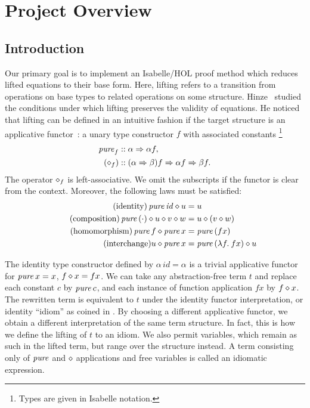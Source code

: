 \section{Project Overview}\label{sec:overview}

\subsection{Introduction}\label{subsec:introduction}

Our primary goal is to implement an Isabelle/HOL proof method which reduces
lifted equations to their base form.
Here, lifting refers to a transition from operations on base types to related
operations on some structure.
Hinze~\cite{hinze10} studied the conditions under which lifting preserves the
validity of equations.
He noticed that lifting can be defined in an intuitive fashion if the target
structure is an applicative functor~\cite{mcbride08}:
a unary type constructor $f$ with associated constants%
\footnote{Types are given in Isabelle notation.}
\begin{align*}
	\operatorname{\mathit{pure}}_f &\mathrel{::} \alpha \Rightarrow \alpha f, \\
	(\diamond_f) &\mathrel{::} (\alpha \Rightarrow \beta) f \Rightarrow \alpha f \Rightarrow \beta f.
\end{align*}
The operator $\diamond_f$ is left-associative.
We omit the subscripts if the functor is clear from the context.
Moreover, the following laws must be satisfied:
\begin{align*}
	\tag{identity} \operatorname{\mathit{pure}}{\mathit{id}} \diamond u &= u \\
	\tag{composition} \operatorname{\mathit{pure}}{(\cdot)} \diamond u \diamond v \diamond w &= u \diamond (v \diamond w) \\
	\tag{homomorphism} \operatorname{\mathit{pure}}{f} \diamond \operatorname{\mathit{pure}} x &= \operatorname{\mathit{pure}}{(f x)} \\
	\tag{interchange} u \diamond \operatorname{\mathit{pure}}{x} &= \operatorname{\mathit{pure}}{(\lambda f.\>f x)} \diamond u
\end{align*}

The identity type constructor defined by $\alpha\,\mathit{id} = \alpha$ is a
trivial applicative functor for $\operatorname{\mathit{pure}}{x} = x$, $f \diamond x = f x$.
We can take any abstraction-free term $t$ and replace each constant $c$ by
$\operatorname{\mathit{pure}}{c}$, and each instance of function application $f x$ by $f \diamond x$.
The rewritten term is equivalent to $t$ under the identity functor
interpretation, or identity ``idiom'' as coined in \cite{mcbride08}.
By choosing a different applicative functor, we obtain a different
interpretation of the same term structure.
In fact, this is how we define the lifting of $t$ to an idiom.
We also permit variables, which remain as such in the lifted term, but range
over the structure instead.
A term consisting only of $\operatorname{\mathit{pure}}$ and $\diamond$ applications and
free variables is called an idiomatic expression.

